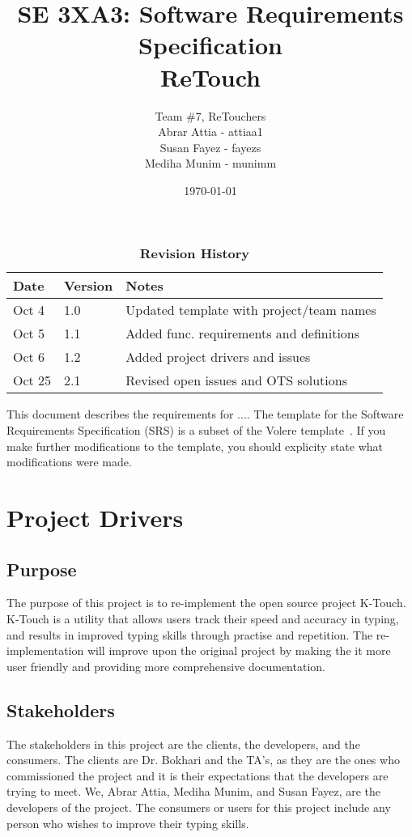\documentclass[12pt, titlepage]{article}
\title{SE 3XA3: Software Requirements Specification\\ReTouch}
\author{Team \#7, ReTouchers
		\\ Abrar Attia - attiaa1
		\\ Susan Fayez - fayezs
		\\ Mediha Munim - munimm
}
\date{\today}
\begin{document}
\maketitle

\tableofcontents
\listoftables
\listoffigures

\begin{table}[bp]
\caption{\bf Revision History}
\begin{tabularx}{\textwidth}{p{3cm}p{2cm}X}
\toprule {\bf Date} & {\bf Version} & {\bf Notes}\\
\midrule
Oct 4 & 1.0 & Updated template with project/team names\\
Oct 5 & 1.1 & Added func. requirements and definitions \\
Oct 6 & 1.2 & Added project drivers and issues\\
Oct 25 & 2.1 & Revised open issues and OTS solutions
\bottomrule
\end{tabularx}
\end{table}

\newpage


This document describes the requirements for ....  The template for the Software
Requirements Specification (SRS) is a subset of the Volere
template~\citep{RobertsonAndRobertson2012}.  If you make further modifications
to the template, you should explicity state what modifications were made.

\section{Project Drivers}
\subsection{Purpose}
\indent \indent The purpose of this project is to re-implement the open source project K-Touch. K-Touch is a utility that allows users track their speed and accuracy in typing, and results in improved typing skills through practise and repetition. The re-implementation will improve upon the original project by making the it more user friendly and providing more comprehensive documentation.

\subsection{Stakeholders}
\indent \indent The stakeholders in this project are the clients, the developers, and the consumers. The clients are Dr. Bokhari and the TA's, as they are the ones who commissioned the project and it is their expectations that the developers are trying to meet. We, Abrar Attia, Mediha Munim, and Susan Fayez, are the developers of the project. The consumers or users for this project include any person who wishes to improve their typing skills.
\end{document}

